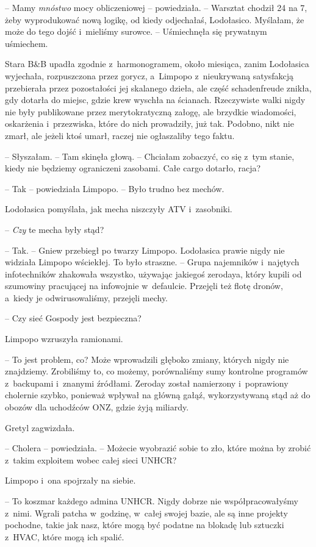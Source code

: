 \documentclass[oneside,polish,11pt,sfheadings]{mwbk}
\begin{document}
-- Mamy \textit{mnóstwo} mocy obliczeniowej -- powiedziała. -- Warsztat chodził 24 na 7, żeby wyprodukować nową logikę, od kiedy
odjechałaś, Lodołasico. Myślałam, że może do tego dojść i~mieliśmy
surowce. -- Uśmiechnęła się prywatnym uśmiechem. 

Stara B\&B upadła
zgodnie z~harmonogramem, około miesiąca, zanim Lodołasica wyjechała,
rozpuszczona przez gorycz, a~Limpopo z~nieukrywaną satysfakcją
przebierała przez pozostałości jej skalanego dzieła, ale część
schadenfreude znikła, gdy dotarła do miejsc, gdzie krew wyschła na
ścianach. Rzeczywiste walki nigdy nie były publikowane przez
merytokratyczną załogę, ale brzydkie wiadomości, oskarżenia i~przezwiska, które do nich prowadziły, już tak. Podobno, nikt nie zmarł,
ale jeżeli ktoś umarł, raczej nie ogłaszaliby tego faktu.

-- Słyszałam. -- Tam skinęła głową. -- Chciałam zobaczyć, co się z~tym
stanie, kiedy nie będziemy ograniczeni zasobami. Całe cargo dotarło,
racja?

-- Tak -- powiedziała Limpopo. -- Było trudno bez mechów.

Lodołasica pomyślała, jak mecha niszczyły ATV i~zasobniki. 

-- \textit{Czy}
te mecha były stąd?

-- Tak. -- Gniew przebiegł po twarzy Limpopo. Lodołasica prawie nigdy nie
widziała Limpopo wściekłej. To było straszne. -- Grupa najemników i~najętych infotechników zhakowała wszystko, używając jakiegoś zerodaya,
który kupili od szumowiny pracującej na infowojnie w~defaulcie. Przejęli
też flotę dronów, a~kiedy je odwirusowaliśmy, przejęli mechy.

-- Czy sieć Gospody jest bezpieczna?

Limpopo wzruszyła ramionami. 

-- To jest problem, co? Może wprowadzili
głęboko zmiany, których nigdy nie znajdziemy. Zrobiliśmy to, co możemy,
porównaliśmy sumy kontrolne programów z~backupami i~znanymi źródłami.
Zeroday został namierzony i~poprawiony cholernie szybko, ponieważ
wpływał na główną gałąź, wykorzystywaną stąd aż do obozów dla uchodźców
ONZ, gdzie żyją miliardy.

Gretyl zagwizdała. 

-- Cholera -- powiedziała. -- Możecie wyobrazić sobie to
zło, które można by zrobić z~takim exploitem wobec całej sieci UNHCR?

Limpopo i~ona spojrzały na siebie. 

-- To koszmar każdego admina UNHCR.
Nigdy dobrze nie współpracowałyśmy z~nimi. Wgrali patcha w~godzinę, w~całej swojej bazie, ale są inne projekty pochodne, takie jak nasz, które
mogą być podatne na blokadę lub sztuczki z~HVAC, które mogą ich spalić.
\end{document}
